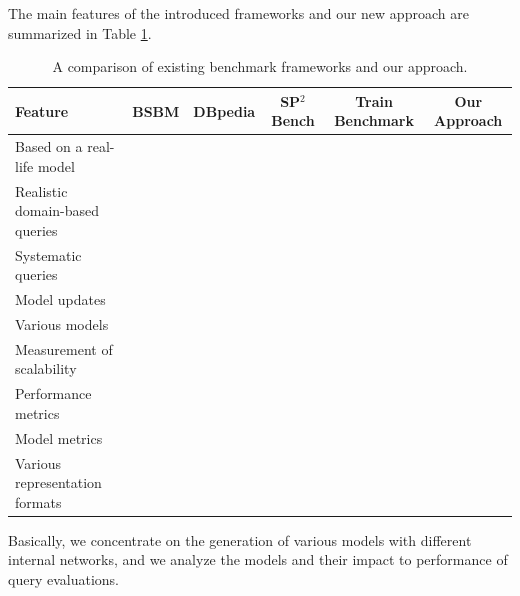 The main features of the introduced frameworks and our new approach are summarized in Table \ref{tab:framework_features}.
\begin{table}[ht]
	\footnotesize
	\centering
	\begin{tabular}{l c c c c c}
		\toprule
		Feature & BSBM & DBpedia & SP$^2$Bench & Train Benchmark & Our Approach\\ \hline
		\midrule
		Based on a real-life model &  & \textbullet & \textbullet & &  \\ \hline
		Realistic domain-based queries & \textbullet & \textbullet &  &  & \\ \hline
		Systematic queries  & &  & \textbullet & & \\ \hline
		Model updates & \textbullet &  &  & \textbullet & \\ \hline
		Various models &  &  &  & & \textbullet \\ \hline
		Measurement of scalability  & \textbullet & \textbullet & \textbullet & \textbullet & \textbullet\\ \hline
		Performance metrics  & \textbullet & \textbullet & \textbullet & &  \\ \hline
		Model metrics &  &  &  & & \textbullet \\ \hline
		Various representation formats & &  &  & \textbullet & \\ \hline
		\bottomrule
	\end{tabular}
	\caption{A comparison of existing benchmark frameworks and our approach.}
	\label{tab:framework_features}
\end{table}

Basically, we concentrate on the generation of various models with different internal networks, and we analyze the models and their impact to performance of query evaluations.